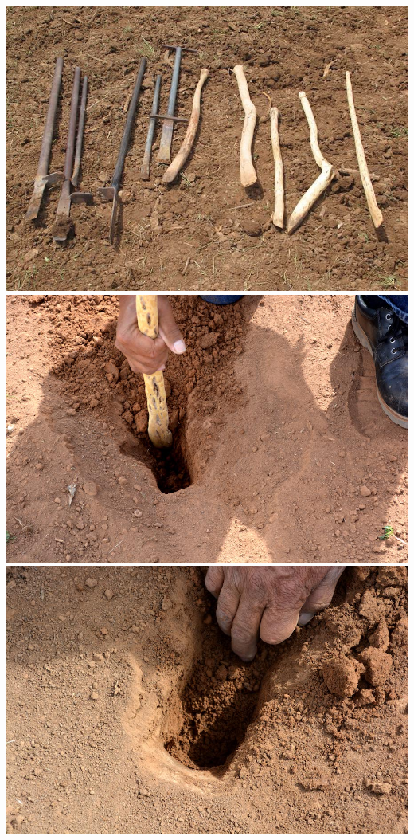 \documentclass[12pt,]{article}
\begin{document}
\includegraphics{./images/planting/3_planting.jpg}
\includegraphics{./images/planting/4_planting.jpg}
\includegraphics{./images/planting/5_planting.jpg}
\end{document}
